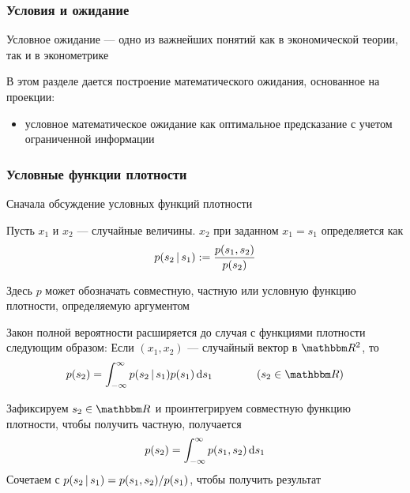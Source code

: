 \begin{frame}\frametitle{Условия и ожидание}

    \vspace{2em}
    Условное ожидание --- одно из важнейших понятий как в экономической теории, 
    так и в эконометрике
    
    В этом разделе дается построение математического ожидания, основанное на проекции:
    
    \begin{itemize}
        \item условное математическое ожидание как оптимальное предсказание 
        с учетом ограниченной информации
    \end{itemize}

\end{frame}

\begin{frame}\frametitle{Условные функции плотности}

    \vspace{2em}
    Сначала обсуждение условных функций плотности 
    
    Пусть $x_1$ и $x_2$ --- случайные величины.  
    $x_2$ при заданном $x_1 = s_1$ определяется как 
    \begin{equation*}
        p(s_2 \, | \, s_1) 
            := \frac{p(s_1, s_2)}{p(s_2)}
    \end{equation*}
    
    Здесь $p$ может обозначать совместную, частную или условную функцию плотности, 
    определяемую аргументом
    
\end{frame}

\begin{frame}

    \vspace{2em}
    Закон полной вероятности расширяется до случая с функциями плотности
    следующим образом: Если $(x_1, x_2)$ --- случайный вектор в $\RR^2$, то
    \begin{equation*}
        \label{eq:dltp}
        p(s_2)
        = \int_{-\infty}^{\infty} p(s_2 \given s_1) p(s_1) \diff s_1
        \qquad \qquad 
        (s_2 \in \RR)
    \end{equation*}
    
    \Prf 
    Зафиксируем $s_2 \in \RR$ и проинтегрируем совместную функцию плотности, чтобы получить частную, получается
    $$
        p(s_2) = \int_{-\infty}^{\infty} p(s_1, s_2) \mathop{}\!\mathrm{d} s_1
    $$
    Сочетаем с $p(s_2 \, | \, s_1) = p(s_1, s_2)/p(s_1)$, чтобы получить результат
    
\end{frame}

